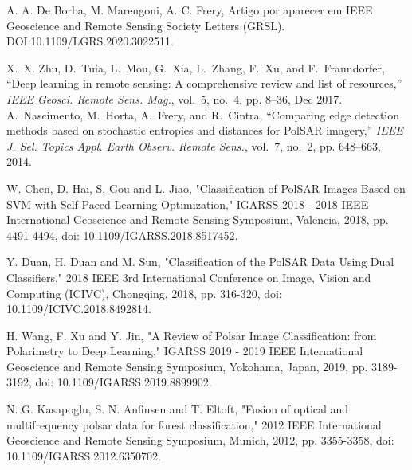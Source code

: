 \documentclass[runningheads]{llncs}
\begin{document}
%
%
%
% 
% 
%
\begin{thebibliography}{8}
A. A. De Borba, M. Marengoni, A. C. Frery, Artigo por aparecer em IEEE Geoscience and Remote Sensing Society Letters (GRSL).  DOI:10.1109/LGRS.2020.3022511. 

X.~X. Zhu, D.~Tuia, L.~Mou, G.~Xia, L.~Zhang, F.~Xu, and F.~Fraundorfer, ``Deep
  learning in remote sensing: A comprehensive review and list of resources,''
  \emph{IEEE Geosci. Remote Sens. Mag.}, vol.~5, no.~4, pp. 8--36, Dec 2017.
A.~Nascimento, M.~Horta, A.~Frery, and R.~Cintra, ``Comparing edge detection
  methods based on stochastic entropies and distances for {P}ol{SAR} imagery,''
  \emph{IEEE J. Sel. Topics Appl. Earth Observ. Remote Sens.}, vol.~7, no.~2,
  pp. 648--663, 2014.

W. Chen, D. Hai, S. Gou and L. Jiao, "Classification of PolSAR Images Based on SVM with Self-Paced Learning Optimization," IGARSS 2018 - 2018 IEEE International Geoscience and Remote Sensing Symposium, Valencia, 2018, pp. 4491-4494, doi: 10.1109/IGARSS.2018.8517452.

Y. Duan, H. Duan and M. Sun, "Classification of the PolSAR Data Using Dual Classifiers," 2018 IEEE 3rd International Conference on Image, Vision and Computing (ICIVC), Chongqing, 2018, pp. 316-320, doi: 10.1109/ICIVC.2018.8492814.

H. Wang, F. Xu and Y. Jin, "A Review of Polsar Image Classification: from Polarimetry to Deep Learning," IGARSS 2019 - 2019 IEEE International Geoscience and Remote Sensing Symposium, Yokohama, Japan, 2019, pp. 3189-3192, doi: 10.1109/IGARSS.2019.8899902.

N. G. Kasapoglu, S. N. Anfinsen and T. Eltoft, "Fusion of optical and multifrequency polsar data for forest classification," 2012 IEEE International Geoscience and Remote Sensing Symposium, Munich, 2012, pp. 3355-3358, doi: 10.1109/IGARSS.2012.6350702.
\end{thebibliography}
\end{document}
